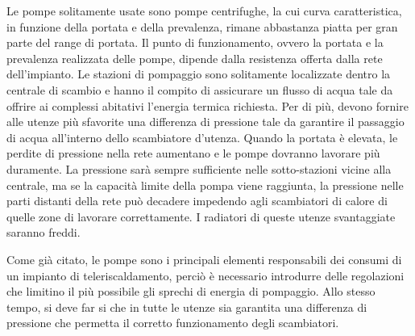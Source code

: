 \documentclass[laurea,oneside,11pt]{USiena_tesiLM3}
\begin{document}
Le pompe solitamente usate sono pompe centrifughe, la cui curva caratteristica, in funzione della portata e della prevalenza, rimane abbastanza piatta per gran parte del range di portata. 
Il punto di funzionamento, ovvero la portata e la prevalenza realizzata delle pompe, dipende dalla resistenza offerta dalla rete dell'impianto. 
Le stazioni di pompaggio sono solitamente localizzate dentro la centrale di scambio e hanno il compito di assicurare un flusso di acqua tale da offrire ai complessi abitativi l'energia termica richiesta. Per di più, devono fornire alle utenze più sfavorite una differenza di pressione tale da garantire il passaggio di acqua all'interno dello scambiatore d'utenza. 
Quando la portata è elevata, le perdite di pressione nella rete aumentano e le pompe dovranno lavorare più duramente. La pressione sarà sempre sufficiente nelle sotto-stazioni vicine alla centrale, ma se la capacità limite della pompa viene raggiunta, la pressione nelle parti distanti della rete  può decadere impedendo agli scambiatori di calore di quelle zone di lavorare correttamente. I radiatori di queste utenze svantaggiate saranno freddi.

Come già citato, le pompe sono i principali elementi responsabili dei consumi di un impianto di teleriscaldamento, perciò è necessario introdurre delle regolazioni che limitino il più possibile gli sprechi di energia di pompaggio. Allo stesso tempo, si deve far si che in tutte le utenze sia garantita una differenza di pressione che permetta il corretto funzionamento degli scambiatori. 
\end{document}
